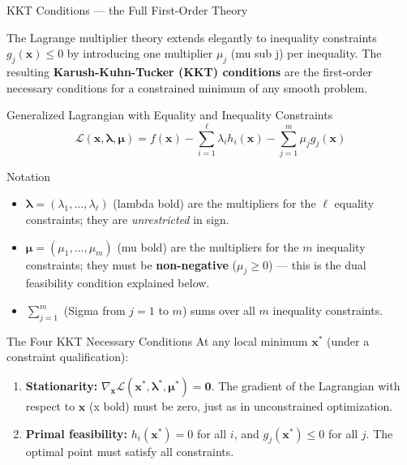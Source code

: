 \documentclass[aspectratio=169,10pt]{beamer}
\newcommand{\bx}{\mathbf{x}}
\newcommand{\blambda}{\bm{\lambda}}
\newcommand{\bmu}{\bm{\mu}}
\newcommand{\Lagr}{\mathcal{L}}
\begin{document}
\begin{frame}[allowframebreaks]{KKT Conditions --- the Full First-Order Theory}

  The Lagrange multiplier theory extends elegantly to inequality constraints
  $g_j(\bx) \le 0$ by introducing one multiplier $\mu_j$ (mu sub j) per
  inequality.  The resulting \textbf{Karush-Kuhn-Tucker (KKT) conditions} are
  the first-order necessary conditions for a constrained minimum of any
  smooth problem.

  \begin{block}{Generalized Lagrangian with Equality and Inequality Constraints}
    \[
      \Lagr(\bx, \blambda, \bmu)
        = f(\bx)
          - \sum_{i=1}^{\ell} \lambda_i h_i(\bx)
          - \sum_{j=1}^{m} \mu_j g_j(\bx)
    \]
  \end{block}

  \begin{block}{Notation}
    \begin{itemize}
      \item $\blambda = (\lambda_1, \ldots, \lambda_\ell)$ (lambda bold) are
            the multipliers for the $\ell$ equality constraints; they are
            \emph{unrestricted} in sign.
      \item $\bmu = (\mu_1, \ldots, \mu_m)$ (mu bold) are the multipliers for
            the $m$ inequality constraints; they must be
            \textbf{non-negative} ($\mu_j \ge 0$) --- this is the dual feasibility
            condition explained below.
      \item $\sum_{j=1}^{m}$ (Sigma from $j=1$ to $m$) sums over all $m$
            inequality constraints.
    \end{itemize}
  \end{block}

  \framebreak

  \begin{block}{The Four KKT Necessary Conditions}
    At any local minimum $\bx^*$ (under a constraint qualification):
    \begin{enumerate}
      \item \textbf{Stationarity:} $\nabla_\bx \Lagr(\bx^*, \blambda^*, \bmu^*) = \mathbf{0}$.
            The gradient of the Lagrangian with respect to $\bx$ (x bold) must
            be zero, just as in unconstrained optimization.

      \item \textbf{Primal feasibility:} $h_i(\bx^*) = 0$ for all $i$, and
            $g_j(\bx^*) \le 0$ for all $j$.  The optimal point must satisfy
            all constraints.


\end{enumerate}
\end{block}
\end{frame}
\end{document}
